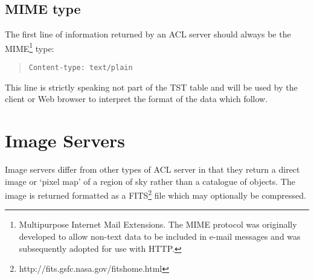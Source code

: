 \documentclass[twoside,11pt]{article}
\newcommand{\htmladdnormallinkfoot}[2]{#1\footnote{#2}}
\newcommand{\xlabel}[1]{}
\renewcommand{\_}{\texttt{\symbol{95}}}
\begin{document}
\subsection{\label{MIME_R}MIME type}

The first line of information returned by an ACL server should always
be the MIME\footnote{Multipurpose Internet Mail Extensions.  The MIME
protocol was originally developed to allow non-text data to be included
in e-mail messages and was subsequently adopted for use with HTTP.} type:

\begin{quote}
{\tt Content-type: text/plain}
\end{quote}

This line is strictly speaking not part of the TST table and will be
used by the client or Web browser to interpret the format of the data
which follow.


\section{\xlabel{IMAGE_R}\label{IMAGE_R}Image Servers}

Image servers differ from other types of ACL server in that they return
a direct image or `pixel map' of a region of sky rather than a catalogue
of objects.  The image is returned formatted as a
\htmladdnormallinkfoot{FITS}{http://fits.gsfc.nasa.gov/fits\_home.html}
file which may optionally be compressed.
\end{document}
